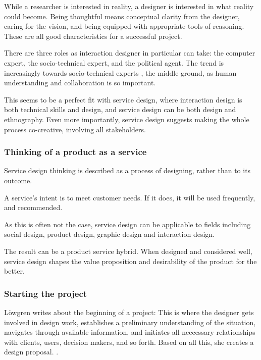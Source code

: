 While a researcher is interested in reality, a designer is interested in what reality could become. \cite{lowgren} Being thoughtful means conceptual clarity from the designer, caring for the vision, and being equipped with appropriate tools of reasoning. These are all good characteristics for a successful project.

There are three roles as interaction designer in particular can take: the computer expert, the socio-technical expert, and the political agent. The trend is increasingly towards socio-technical experts \cite{lowgren}, the middle ground, as human understanding and collaboration is so important.

This seems to be a perfect fit with service design, where interaction design is both technical skills and design, and service design can be both design and ethnography. Even more importantly, service design suggests making the whole process co-creative, involving all stakeholders. \cite{stickdorn}

\subsubsection{Thinking of a product as a service}

Service design thinking is described as a process of designing, rather than to its outcome.

A service's intent is to meet customer needs. If it does, it will be used frequently, and recommended. \cite{stickdorn}

As this is often not the case, service design can be applicable to fields including social design, product design, graphic design and interaction design.

The result can be a product service hybrid. When designed and considered well, service design shapes the value proposition and desirability of the product for the better.

\subsubsection{Starting the project}

Löwgren writes about the beginning of a project: This is where the designer gets involved in design work, establishes a preliminary understanding of the situation, navigates through available information, and initiates all neccessary relationships with clients, users, decision makers, and so forth. Based on all this, she creates a design proposal. \cite{lowgren}.
